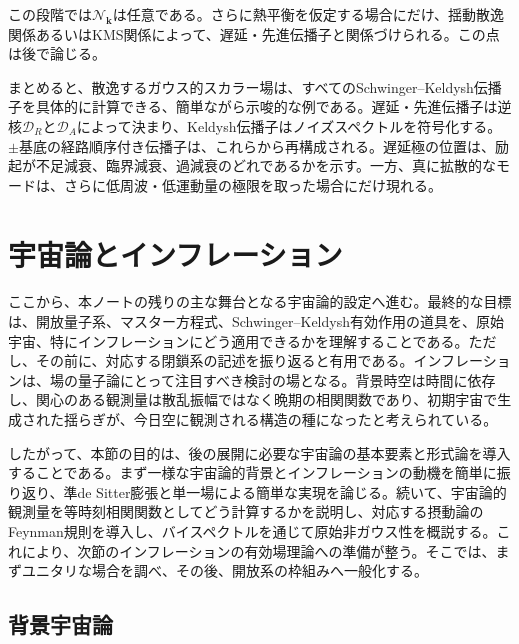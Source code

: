 \documentclass[a4paper,11pt,oneside]{article}
\theoremstyle{definition}
\numberwithin{equation}{section}
\begin{document}
この段階では\(\mathcal N_{\mathbf k}\)は任意である。さらに熱平衡を仮定する場合にだけ、揺動散逸関係あるいはKMS関係によって、遅延・先進伝播子と関係づけられる。この点は後で論じる。



まとめると、散逸するガウス的スカラー場は、すべてのSchwinger--Keldysh伝播子を具体的に計算できる、簡単ながら示唆的な例である。遅延・先進伝播子は逆核\(\mathcal D_R\)と\(\mathcal D_A\)によって決まり、Keldysh伝播子はノイズスペクトルを符号化する。\(\pm\)基底の経路順序付き伝播子は、これらから再構成される。遅延極の位置は、励起が不足減衰、臨界減衰、過減衰のどれであるかを示す。一方、真に拡散的なモードは、さらに低周波・低運動量の極限を取った場合にだけ現れる。





\section{宇宙論とインフレーション}\label{sec:5}



ここから、本ノートの残りの主な舞台となる宇宙論的設定へ進む。最終的な目標は、開放量子系、マスター方程式、Schwinger--Keldysh有効作用の道具を、原始宇宙、特にインフレーションにどう適用できるかを理解することである。ただし、その前に、対応する閉鎖系の記述を振り返ると有用である。インフレーションは、場の量子論にとって注目すべき検討の場となる。背景時空は時間に依存し、関心のある観測量は散乱振幅ではなく晩期の相関関数であり、初期宇宙で生成された揺らぎが、今日空に観測される構造の種になったと考えられている。



したがって、本節の目的は、後の展開に必要な宇宙論の基本要素と形式論を導入することである。まず一様な宇宙論的背景とインフレーションの動機を簡単に振り返り、準de Sitter膨張と単一場による簡単な実現を論じる。続いて、宇宙論的観測量を等時刻相関関数としてどう計算するかを説明し、対応する摂動論のFeynman規則を導入し、バイスペクトルを通じて原始非ガウス性を概説する。これにより、次節のインフレーションの有効場理論への準備が整う。そこでは、まずユニタリな場合を調べ、その後、開放系の枠組みへ一般化する。




 

\subsection{背景宇宙論}
\end{document}
